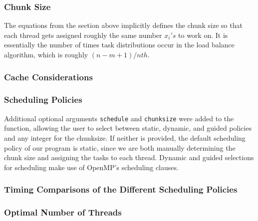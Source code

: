 \subsubsection{Chunk Size}
The equations from the section above implicitly defines the chunk size so that each thread gets assigned roughly the same number $x_{i}'s$ to work on. It is essentially the number of times task distributions occur in the load balance algorithm, which is roughly $(n-m+1)/nth$.

\subsubsection{Cache Considerations}

\subsubsection{Scheduling Policies}
Additional optional arguments \texttt{schedule} and \texttt{chunksize} were added to the function, allowing the user to select between static, dynamic, and guided policies and any integer for the chunksize. If neither is provided, the default scheduling policy of our program is static, since we are both manually determining the chunk size and assigning the tasks to each thread. Dynamic and guided selections for scheduling make use of OpenMP's scheduling clauses.


\subsubsection{Timing Comparisons of the Different Scheduling Policies}


\subsubsection{Optimal Number of Threads}


